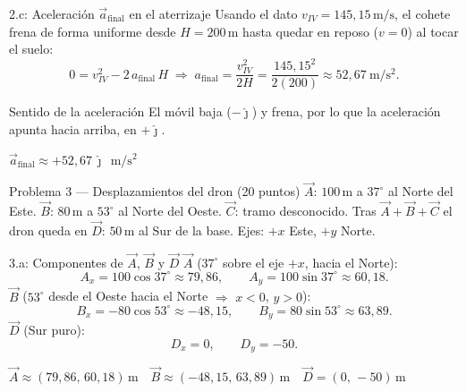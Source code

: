 \documentclass[letterpaper, 11pt]{article}
\begin{document}
\begin{paso}{2.c: Aceleraci\'on $\vec{a}_{\mathrm{final}}$ en el aterrizaje}
Usando el dato $v_{IV}=145{,}15\,\mathrm{m/s}$, el cohete frena de forma uniforme
desde $H=200\,\mathrm{m}$ hasta quedar en reposo ($v=0$) al tocar el suelo:
\[
0=v_{IV}^2-2\,a_{\mathrm{final}}\,H
\;\Rightarrow\;
a_{\mathrm{final}}=\frac{v_{IV}^2}{2H}=\frac{145{,}15^2}{2(200)}\approx 52{,}67\ \mathrm{m/s^2}.
\]
\begin{justif}{Sentido de la aceleraci\'on}
El m\'ovil baja ($-\hat{\jmath}$) y frena, por lo que la aceleraci\'on apunta hacia
arriba, en $+\hat{\jmath}$.
\end{justif}
\begin{resultado}\centering
$\displaystyle \vec{a}_{\mathrm{final}}\approx +52{,}67\,\hat{\jmath}\ \ \mathrm{m/s^2}$
\end{resultado}
\end{paso}

\newpage
\begin{enunciadobox}{Problema 3 --- Desplazamientos del dron \hfill (20 puntos)}
$\vec{A}$: $100\,\mathrm{m}$ a $37^\circ$ al Norte del Este.\quad
$\vec{B}$: $80\,\mathrm{m}$ a $53^\circ$ al Norte del Oeste.\quad
$\vec{C}$: tramo desconocido.\quad
Tras $\vec{A}+\vec{B}+\vec{C}$ el dron queda en
$\vec{D}$: $50\,\mathrm{m}$ al Sur de la base. Ejes: $+x$ Este, $+y$ Norte.
\end{enunciadobox}

\begin{paso}{3.a: Componentes de $\vec{A}$, $\vec{B}$ y $\vec{D}$}
\textbf{$\vec{A}$} ($37^\circ$ sobre el eje $+x$, hacia el Norte):
\[
A_x=100\cos 37^\circ\approx 79{,}86,\qquad A_y=100\sin 37^\circ\approx 60{,}18 .
\]
\textbf{$\vec{B}$} ($53^\circ$ desde el Oeste hacia el Norte $\Rightarrow$ $x<0$, $y>0$):
\[
B_x=-80\cos 53^\circ\approx -48{,}15,\qquad B_y=80\sin 53^\circ\approx 63{,}89 .
\]
\textbf{$\vec{D}$} (Sur puro):
\[
D_x=0,\qquad D_y=-50 .
\]
\begin{resultado}\centering
$\vec{A}\approx(79{,}86,\,60{,}18)\,\mathrm{m}\quad
 \vec{B}\approx(-48{,}15,\,63{,}89)\,\mathrm{m}\quad
 \vec{D}=(0,\,-50)\,\mathrm{m}$
\end{resultado}
\end{paso}
\end{document}
